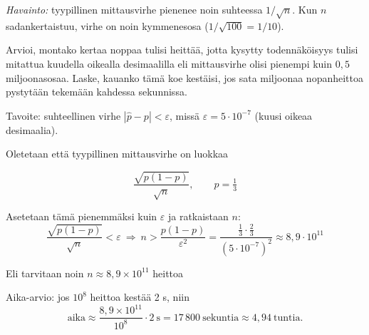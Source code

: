 \documentclass[12pt,a4paper]{article}
\begin{document}
\begin{kohta}
  \emph{Havainto:} tyypillinen mittausvirhe pienenee noin suhteessa \(1/\sqrt{n}\).
  Kun \(n\) sadankertaistuu, virhe on noin kymmenesosa (\(1/\sqrt{100}=1/10\)).

  \item Arvioi, montako kertaa noppaa tulisi heittää, jotta kysytty
todennäköisyys tulisi mitattua kuudella oikealla desimaalilla eli mittausvirhe 
olisi pienempi kuin $0{,}5$ miljoonasosaa. Laske, kauanko tämä koe kestäisi,
jos sata miljoonaa nopanheittoa pystytään tekemään kahdessa sekunnissa.
\vspace{0.4cm}
  
Tavoite: suhteellinen virhe $|\hat p - p| < \varepsilon$, missä $\varepsilon=5\cdot 10^{-7}$ (kuusi oikeaa desimaalia).\newline
\vspace{0.4cm}

Oletetaan että tyypillinen mittausvirhe on luokkaa

\[
\frac{\sqrt{p(1-p)}}{\sqrt{n}},\qquad p=\tfrac13
\]
\vspace{0.4cm}

Asetetaan tämä pienemmäksi kuin $\varepsilon$ ja ratkaistaan $n$:
\[
\frac{\sqrt{p(1-p)}}{\sqrt{n}} < \varepsilon
\ \Rightarrow \
n > \frac{p(1-p)}{\varepsilon^2}
= \frac{\tfrac13\cdot\tfrac23}{(5\cdot 10^{-7})^2}
\approx 8{,}9\cdot 10^{11}
\]
\vspace{0.4cm}

Eli tarvitaan noin \(n \approx 8{,}9\times 10^{11}\) heittoa

Aika-arvio: jos $10^8$ heittoa kestää 2 s, niin
\[
\text{aika} \approx \frac{8{,}9\times 10^{11}}{10^8}\cdot 2\ \text{s}
= 17\,800\ \text{sekuntia}
\approx 4{,}94\ \text{tuntia}.
\]
\end{kohta}
\end{document}
